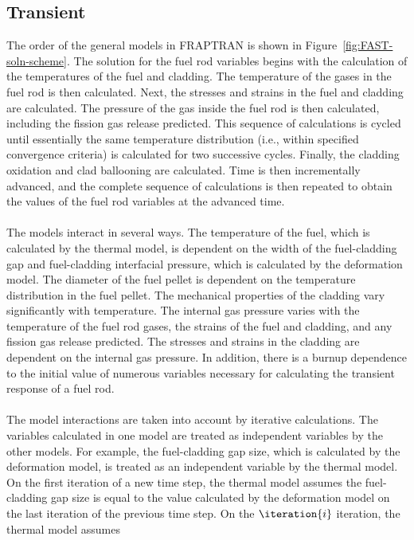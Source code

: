 \subsection{Transient}\label{transient-1}
The order of the general models in FRAPTRAN is shown in Figure~\ref{fig:FAST-soln-scheme}.  The
solution for the fuel rod variables begins with the calculation of the temperatures of the fuel and
cladding. The temperature of the gases in the fuel rod is then calculated. Next, the stresses and
strains in the fuel and cladding are calculated. The pressure of the gas inside the fuel rod is then
calculated, including the fission gas release predicted. This sequence of calculations is cycled
until essentially the same temperature distribution (i.e., within specified convergence criteria) is
calculated for two successive cycles. Finally, the cladding oxidation and clad ballooning are
calculated. Time is then incrementally advanced, and the complete sequence of calculations is then
repeated to obtain the values of the fuel rod variables at the advanced time.
\\
\\
The models interact in several ways. The temperature of the fuel, which is calculated by the thermal
model, is dependent on the width of the fuel-cladding gap and fuel-cladding interfacial pressure,
which is calculated by the deformation model. The diameter of the fuel pellet is dependent on the
temperature distribution in the fuel pellet. The mechanical properties of the cladding vary
significantly with temperature. The internal gas pressure varies with the temperature of the fuel
rod gases, the strains of the fuel and cladding, and any fission gas release predicted. The stresses
and strains in the cladding are dependent on the internal gas pressure. In addition, there is a
burnup dependence to the initial value of numerous variables necessary for calculating the transient
response of a fuel rod.
\\
\\
The model interactions are taken into account by iterative calculations.  The variables calculated
in one model are treated as independent variables by the other models. For example, the
fuel-cladding gap size, which is calculated by the deformation model, is treated as an independent
variable by the thermal model. On the first iteration of a new time step, the thermal model assumes
the fuel-cladding gap size is equal to the value calculated by the deformation model on the last
iteration of the previous time step. On the \(\iteration{i}\) iteration, the thermal model assumes
